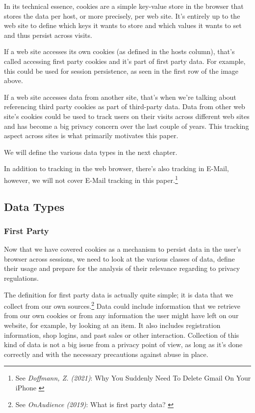 In its technical essence, cookies are a simple key-value store in the browser that stores the data per host, or more precisely, per web site. It's entirely up to the web site to define which keys it wants to store and which values it wants to set and thus persist across visits. 

If a web site accesses its own cookies (as defined in the hosts column), that's called accessing first party cookies and it's part of first party data. For example, this could be used for session persistence, as seen in the first row of the image above. 

If a web site accesses data from another site, that's when we're talking about referencing third party cookies as part of third-party data. Data from other web site's cookies could be used to track users on their visits across different web sites and has become a big privacy concern over the last couple of years. This tracking aspect across sites is what primarily motivates this paper.

We will define the various data types in the next chapter.

In addition to tracking in the web browser, there's also tracking in E-Mail, however, we will not cover E-Mail tracking in this paper.\footnote{See \textit{Doffmann, Z. (2021)}: Why You Suddenly Need To Delete Gmail On Your iPhone \cite{deleteGmail}}

\subsection{Data Types}

\subsubsection{First Party}

Now that we have covered cookies as a mechanism to persist data in the user's browser across sessions, we need to look at the various classes of data, define their usage and prepare for the analysis of their relevance regarding to privacy regulations.

The definition for first party data is actually quite simple; it is data that we collect from our own sources.\footnote{See \textit{OnAudience (2019)}: What is first party data? \cite{firstParty}} Data could include information that we retrieve from our own cookies or from any information the user might have left on our website, for example, by looking at an item. It also includes registration information, shop logins, and past sales or other interaction. Collection of this kind of data is not a big issue from a privacy point of view, as long as it's done correctly and with the necessary precautions against abuse in place.

